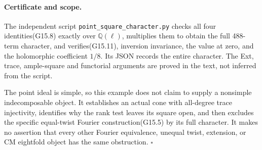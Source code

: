 \paragraph{Certificate and scope.}
The independent script \texttt{point\_square\_character.py}
checks all four identities(G15.8) exactly over
$\mathbb Q(\ell)$, multiplies them to obtain the full
488-term character, and verifies(G15.11), inversion
invariance, the value at zero, and the holomorphic
coefficient $1/8$. Its JSON records the entire character.
The Ext, trace, ample-square and functorial arguments
are proved in the text, not inferred from the script.

The point ideal is simple, so this example does not
claim to supply a nonsimple indecomposable object.
It establishes an actual cone with all-degree trace
injectivity, identifies why the rank test leaves its
square open, and then excludes the specific equal-twist
Fourier construction(G15.5) by its full character.
It makes no assertion that every other Fourier
equivalence, unequal twist, extension, or CM
eightfold object has the same obstruction.
\hfill$\square$
